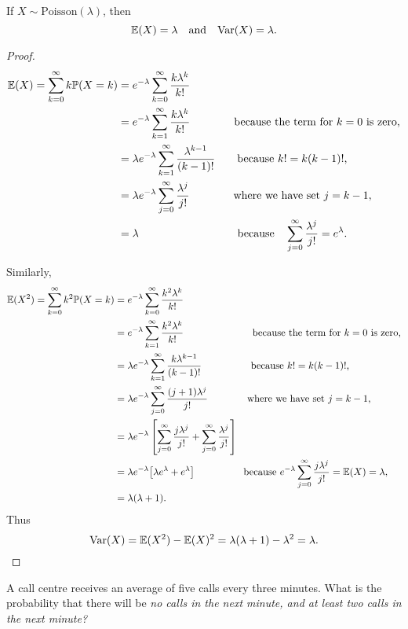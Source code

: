 \begin{lemma}
If $X\sim\text{Poisson}(\lambda)$, then 
\[
\mathbb{E}(X)= \lambda \quad\text{and}\quad \text{Var}(X) = \lambda.
\]
\end{lemma}

\begin{proof}
\begin{align*}
\mathbb{E}(X) = \sum_{k=0}^\infty k \mathbb{P}(X=k)
	& = e^{-\lambda}\sum_{k=0}^\infty \frac{k\lambda^k}{k!} \\
	& = e^{-\lambda}\sum_{k=1}^\infty \frac{k\lambda^k}{k!} \qquad\qquad\text{because the term for $k=0$ is zero,}\\
	& = \lambda e^{-\lambda}\sum_{k=1}^\infty \frac{\lambda^{k-1}}{(k-1)!} \qquad\text{because $k!=k(k-1)!$,}\\
	& = \lambda e^{-\lambda}\sum_{j=0}^\infty \frac{\lambda^j}{j!} \qquad\qquad\text{where we have set $j=k-1$,}\\
	& = \lambda \quad\qquad\qquad\qquad\qquad\text{because}\quad \sum_{j=0}^\infty \frac{\lambda^j}{j!}= e^{\lambda}.
\end{align*}

Similarly,
\begin{align*}
\mathbb{E}(X^2) = \sum_{k=0}^\infty k^2 \mathbb{P}(X=k)
	& = e^{-\lambda}\sum_{k=0}^\infty \frac{k^2\lambda^k}{k!} \\
	& = e^{-\lambda}\sum_{k=1}^\infty \frac{k^2\lambda^k}{k!} \quad\qquad\qquad\qquad\text{because the term for $k=0$ is zero,}\\
	& = \lambda e^{-\lambda}\sum_{k=1}^\infty \frac{k\lambda^{k-1}}{(k-1)!} \quad\qquad\qquad\text{because $k!=k(k-1)!$,}\\
	& = \lambda e^{-\lambda}\sum_{j=0}^\infty \frac{(j+1)\lambda^j}{j!} \qquad\qquad\text{where we have set $j=k-1$,}\\
	& = \lambda e^{-\lambda}\left[\sum_{j=0}^\infty \frac{j\lambda^j}{j!} + \sum_{j=0}^\infty \frac{\lambda^j}{j!}\right]\\
	& = \lambda e^{-\lambda}\big[\lambda e^{\lambda} + e^{\lambda}\big] \quad\qquad\qquad\text{because $e^{-\lambda}\sum_{j=0}^\infty \frac{j\lambda^j}{j!} = \mathbb{E}(X) = \lambda$,}\\
	& = \lambda(\lambda+1).
\end{align*}
Thus
\[
\text{Var}(X) = \mathbb{E}(X^2)-\mathbb{E}(X)^2 = \lambda(\lambda+1)-\lambda^2 = \lambda.
\]
\end{proof}
\begin{example}
A call centre receives an average of five calls every three minutes. What is the probability that there will be
\ben
\it no calls in the next minute, and
\it at least two calls in the next minute?
\een
\end{example}
